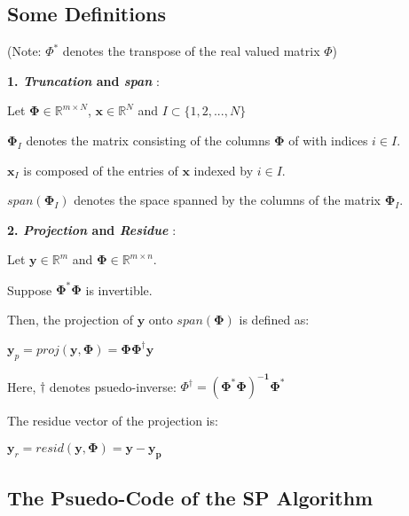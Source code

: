 \documentclass[fleqn, 11pt]{article}
\newcommand{\bs}[1]{\boldsymbol{#1}}
\newcommand{\R}[0]{\mathbb{R}}
\begin{document}
\hrulefill

\subsection*{Some Definitions}

(Note: $\Phi^*$ denotes the transpose of the real valued matrix $\Phi$)

\medskip


\textbf{1. \textit{Truncation} and \textit{span} }: 

\smallskip

Let $\bs{\Phi} \in \R^{m \times N}$, $\bs{x} \in \R^N$ and $I \subset \{ 1,2,..., N \} $ 

\smallskip

$\bs{\Phi}_{I}$ denotes the matrix consisting of the columns $\bs{\Phi}$ of with indices $i \in I$. 

\smallskip

$\bs{x}_{I}$ is composed of the entries of $\bs{x}$
indexed by $i \in I$. 

\smallskip

$span(\bs{\Phi}_{I})$ denotes the space spanned by the columns of the matrix $\bs{\Phi}_{I}$.


\bigskip 

\textbf{2. \textit{Projection} and \textit{Residue} }: 

\smallskip

Let $\bs{y} \in \R^m$ and $\bs{\Phi} \in \R^{m \times n}$. 

Suppose  $\bs{\Phi^*\Phi}$ is invertible. 

Then, the projection of $\bs{y}$ onto  $span(\bs{\Phi})$ is defined as:
\begin{center}
    $\bs{y}_p = proj( \bs{y} ,\bs{\Phi}  )  = \bs{\Phi \Phi^{\dagger} y }  $ 
\end{center}

Here, $\dagger$ denotes psuedo-inverse: $\Phi^{\dagger} = \bs{(\Phi^*\Phi)^{-1}\Phi^*}  $

\medskip

The residue vector of the projection is: 
\begin{center}
    $\bs{y}_r = resid( \bs{y} ,\bs{\Phi}  )  = \bs{y - y_p } $ 
\end{center}


\newpage 


\subsection*{The Psuedo-Code of the SP Algorithm}
\end{document}
